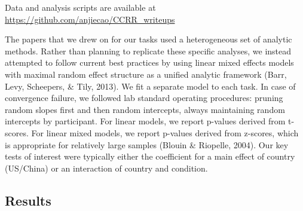 \documentclass[
  man,floatsintext]{apa6}
\begin{document}
Data and analysis scripts are available at \url{https://github.com/anjiecao/CCRR_writeups}

The papers that we drew on for our tasks used a heterogeneous set of analytic methods. Rather than planning to replicate these specific analyses, we instead attempted to follow current best practices by using linear mixed effects models with maximal random effect structure as a unified analytic framework (Barr, Levy, Scheepers, \& Tily, 2013). We fit a separate model to each task. In case of convergence failure, we followed lab standard operating procedures: pruning random slopes first and then random intercepts, always maintaining random intercepts by participant. For linear models, we report p-values derived from t-scores. For linear mixed models, we report p-values derived from z-scores, which is appropriate for relatively large samples (Blouin \& Riopelle, 2004). Our key tests of interest were typically either the coefficient for a main effect of country (US/China) or an interaction of country and condition.

\hypertarget{results}{%
\subsection{Results}\label{results}}
\end{document}
